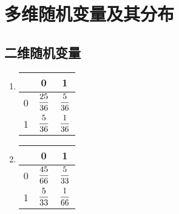 \section{多维随机变量及其分布}
\subsection{二维随机变量}
\begin{prob}
	\begin{enumerate}
	\item 	
	\renewcommand{\arraystretch}{1.7}
	\begin{tabular}{c|cc}
		\hline
		\diagbox[width=2cm, height=1.2cm]{$Y$}{$X$}&0&1\\
		\hline
		0& $\displaystyle\frac{25}{36}$& $\displaystyle\frac{5}{36}$\\
		1& $\displaystyle\frac{5}{36}$ & $\displaystyle\frac{1}{36}$\\
		\hline
	\end{tabular}
	\item 	
		\begin{tabular}{c|cc}
			\hline
			\diagbox[width=2cm, height=1.2cm]{$Y$}{$X$}&0&1\\
			\hline
			0& $\displaystyle\frac{45}{66}$& $\displaystyle\frac{5}{33}$\\
			1& $\displaystyle\frac{5}{33}$& $\displaystyle\frac{1}{66}$\\
			\hline
		\end{tabular}
	\end{enumerate}
\end{prob}

